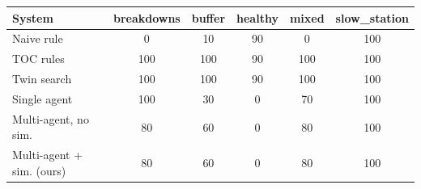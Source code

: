 \begin{tabular}{lccccc}
\toprule
System & breakdowns & buffer & healthy & mixed & slow\_station \\
\midrule
Naive rule & 0 & 10 & 90 & 0 & 100 \\
TOC rules & 100 & 100 & 90 & 100 & 100 \\
Twin search & 100 & 100 & 90 & 100 & 100 \\
Single agent & 100 & 30 & 0 & 70 & 100 \\
Multi-agent, no sim. & 80 & 60 & 0 & 80 & 100 \\
Multi-agent + sim. (ours) & 80 & 60 & 0 & 80 & 100 \\
\bottomrule
\end{tabular}

